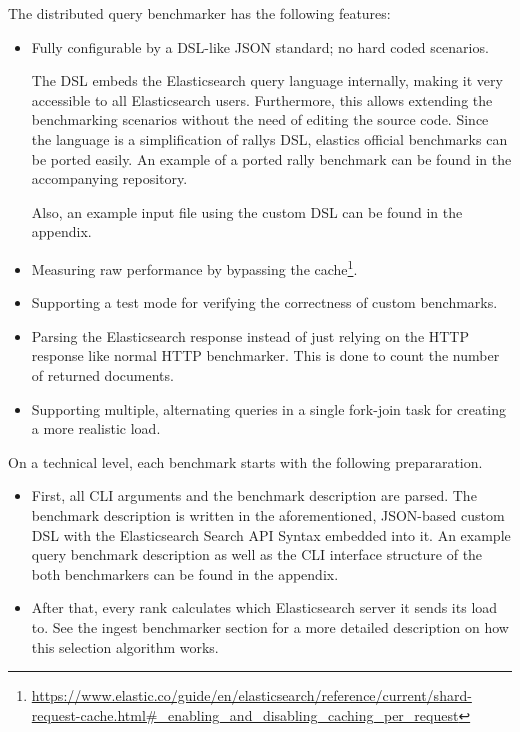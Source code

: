 The distributed query benchmarker has the following features:
\begin{itemize}
  \item Fully configurable by a \ac{DSL}-like \ac{JSON} standard; no hard coded scenarios.

    The \ac{DSL} embeds the Elasticsearch query language internally, making it very accessible to all Elasticsearch users. Furthermore, this allows extending the benchmarking scenarios without the need of editing the source code. Since the language is a simplification of rallys \ac{DSL}, elastics official benchmarks can be ported easily. An example of a ported rally benchmark can be found in the accompanying repository.

    Also, an example input file using the custom \ac{DSL} can be found in the appendix.
  \item Measuring raw performance by bypassing the cache\footnote{\url{https://www.elastic.co/guide/en/elasticsearch/reference/current/shard-request-cache.html\#_enabling_and_disabling_caching_per_request}}.
  \item Supporting a test mode for verifying the correctness of custom benchmarks.
  \item Parsing the Elasticsearch response instead of just relying on the HTTP response like normal HTTP benchmarker. This is done to count the number of returned documents.
  \item Supporting multiple, alternating queries in a single fork-join task for creating a more realistic load.
\end{itemize}

On a technical level, each benchmark starts with the following prepararation.
\begin{itemize}
  \item First, all \ac{CLI} arguments and the benchmark description are parsed. The benchmark description is written in the aforementioned, JSON-based custom DSL with the Elasticsearch Search API Syntax embedded into it. An example query benchmark description as well as the \ac{CLI} interface structure of the both benchmarkers can be found in the appendix.
  \item After that, every rank calculates which Elasticsearch server it sends its load to. See the ingest benchmarker section for a more detailed description on how this selection algorithm works.
\end{itemize}

